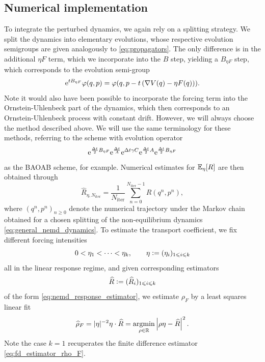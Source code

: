 \subsection{Numerical implementation}
To integrate the perturbed dynamics, we again rely on a splitting strategy.
We split the dynamics into elementary evolutions, whose respective evolution semigroups are given analogously to \eqref{eq:propagators}.
The only difference is in the additional $\eta F$ term, which we incorporate into the $B$ step, yielding a $B_{\eta F}$ step, which corresponds to the evolution semi-group
\begin{equation}
    \label{eq:B_etaF_step}
    \mathrm{e}^{tB_{\eta F}}\varphi(q,p)=\varphi(q,p-t\left(\nabla V(q)-\eta F(q)\right)).
\end{equation}
Note it would also have been possible to incorporate the forcing term into the Ornstein-Uhlenbeck part of the dynamics, which then corresponds to an Ornstein-Uhlenbeck process with constant drift.
However, we will always choose the method described above. We will use the same terminology for these methods, referring to the scheme with evolution operator
\begin{equation}
    \mathrm{e}^{\frac{{\Delta t}}2B_{\eta F}}\mathrm{e}^{\frac{{\Delta t}}A}\mathrm{e}^{{\Delta t}\gamma C}\mathrm{e}^{\frac{{\Delta t}}2A}\mathrm{e}^{\frac{{\Delta t}}2B_{\eta F}}
\end{equation}
as the BAOAB scheme, for example.
Numerical estimates for $\mathbb{E}_\eta[R]$ are then obtained through 
\begin{equation}
    \label{eq:nemd_response_estimator}
    \widehat{R}_{\eta,N_{\mathrm{iter}}}= \frac{1}{N_{\mathrm{iter}}}\sum_{n=0}^{N_\mathrm{iter}-1} R(q^n,p^n),
\end{equation}
where $(q^n,p^n)_{n\geq 0}$ denote the numerical trajectory under the Markov chain obtained for a chosen splitting of the non-equilibrium dynamics \eqref{eq:general_nemd_dynamics}.
To estimate the transport coefficient, we fix different forcing intensities
\[0<\eta_1<\dotsm<\eta_k,\qquad \eta\mathrel{\mathop:}= (\eta_i)_{1\leqslant i\leqslant k}\]
all in the linear response regime, and given corresponding estimators 
\[\widehat{R} \mathrel{\mathop:}= (\widehat{R}_i)_{1\leqslant i\leqslant k}\]
of the form \eqref{eq:nemd_response_estimator}, we estimate $\rho_F$ by a least squares linear fit 
\begin{equation}
    \label{eq:rho_F_nemd_estimator}
    \widehat{\rho}_F= |\eta|^{-2}\eta\cdot\widehat{R}= \underset{\rho \in \mathbb{R}}{\mathrm{argmin}} \left| \rho\eta - \widehat{R}\right|^2.
\end{equation}
Note the case $k=1$ recuperates the finite difference estimator \eqref{eq:fd_estimator_rho_F}. 
